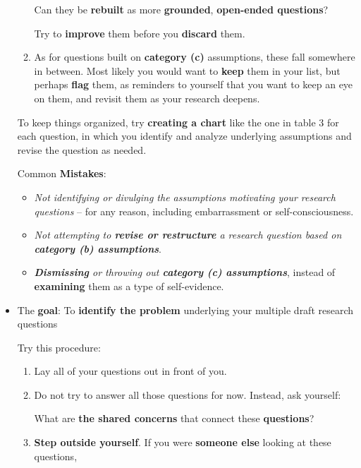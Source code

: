 \documentclass[11pt]{article}
\begin{document}
\begin{itemize}
\begin{exercise}
\begin{enumerate}
Can they be \textbf{rebuilt} as more \textbf{grounded}, \textbf{open-ended questions}?

Try to \textbf{improve} them before you \textbf{discard} them.

\item As for questions built on \textbf{category (c)} assumptions, these fall somewhere in between. Most likely you
would want to \textbf{keep} them in your list, but perhaps \textbf{flag} them, as reminders to yourself that you want to keep an eye on them, and revisit them as your research deepens.
\end{enumerate}
To keep things organized, try \textbf{creating a chart} like the one in table 3 for each question, in which you identify and analyze underlying assumptions and revise the question as needed.
\end{exercise}
Common \textbf{Mistakes}:
\begin{itemize}
\item \emph{Not identifying or divulging the assumptions motivating your research questions} -- for any reason, including embarrassment or self-consciousness. 

\item \emph{Not attempting to \textbf{revise or restructure} a research question based on \textbf{category (b) assumptions}}.

\item \emph{\textbf{Dismissing} or throwing out \textbf{category (c) assumptions}}, instead of \textbf{examining} them as a type of self-evidence. 
\end{itemize}

\vspace{20pt}
\item \begin{exercise}

The \textbf{goal}: To \textbf{identify the problem} underlying your multiple draft research questions

Try this procedure:
\begin{enumerate}
\item Lay all of your questions out in front of you.

\item Do not try to answer all those questions for now. Instead, ask yourself: 

What are \textbf{the shared concerns} that connect these \textbf{questions}?

\item \textbf{Step outside yourself}. If you were \textbf{someone else} looking at these questions, 


\end{enumerate}
\end{exercise}
\end{itemize}
\end{document}
